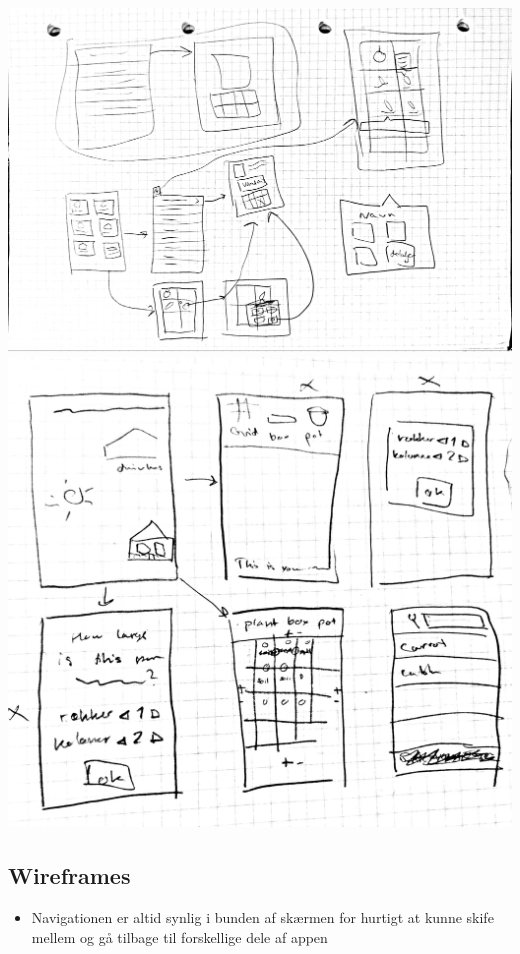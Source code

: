 \includegraphics[width=1\textwidth]{img/s1-7.jpg}\\
\includegraphics[width=1\textwidth]{img/s1-9.jpg}\\

\subsection{Wireframes}
\label{wireframes}

\begin{itemize}
    \item Navigationen er altid synlig i bunden af skærmen for hurtigt at kunne skife mellem og gå tilbage til forskellige dele af appen
\end{itemize}

